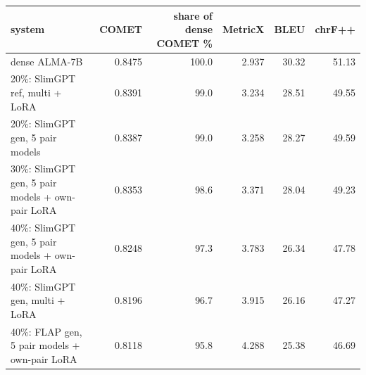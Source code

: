 \begin{tabular}{lrrrrr}
\toprule
system & COMET & share of dense COMET \% & MetricX & BLEU & chrF++ \\
\midrule
dense ALMA-7B & 0.8475 & 100.0 & 2.937 & 30.32 & 51.13 \\
20\%: SlimGPT ref, multi + LoRA & 0.8391 & 99.0 & 3.234 & 28.51 & 49.55 \\
20\%: SlimGPT gen, 5 pair models & 0.8387 & 99.0 & 3.258 & 28.27 & 49.59 \\
30\%: SlimGPT gen, 5 pair models + own-pair LoRA & 0.8353 & 98.6 & 3.371 & 28.04 & 49.23 \\
40\%: SlimGPT gen, 5 pair models + own-pair LoRA & 0.8248 & 97.3 & 3.783 & 26.34 & 47.78 \\
40\%: SlimGPT gen, multi + LoRA & 0.8196 & 96.7 & 3.915 & 26.16 & 47.27 \\
40\%: FLAP gen, 5 pair models + own-pair LoRA & 0.8118 & 95.8 & 4.288 & 25.38 & 46.69 \\
\bottomrule
\end{tabular}
